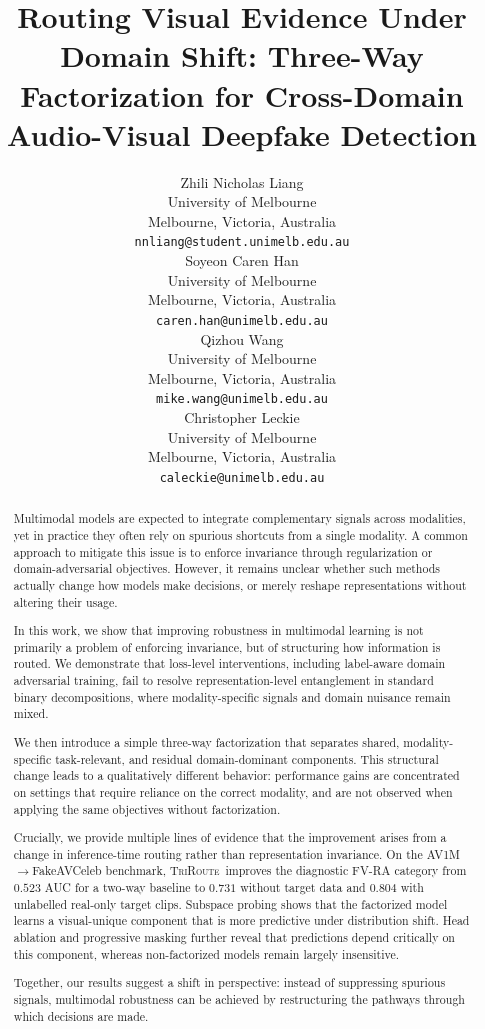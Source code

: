 \documentclass{article}
\title{Routing Visual Evidence Under Domain Shift: Three-Way Factorization for Cross-Domain Audio-Visual Deepfake Detection}
\author{%
  Zhili Nicholas Liang \\
  University of Melbourne \\
  Melbourne, Victoria, Australia \\
  \texttt{nnliang@student.unimelb.edu.au} \\
  \And
  Soyeon Caren Han \\
  University of Melbourne \\
  Melbourne, Victoria, Australia \\
  \texttt{caren.han@unimelb.edu.au} \\
  \And
  Qizhou Wang \\
  University of Melbourne \\
  Melbourne, Victoria, Australia \\
  \texttt{mike.wang@unimelb.edu.au} \\
  \And
  Christopher Leckie \\
  University of Melbourne \\
  Melbourne, Victoria, Australia \\
  \texttt{caleckie@unimelb.edu.au} \\
}
\newcommand{\method}{\textsc{TriRoute}}
\begin{document}
\maketitle

\begin{abstract}
Multimodal models are expected to integrate complementary signals across modalities, yet in practice they often rely on spurious shortcuts from a single modality. A common approach to mitigate this issue is to enforce invariance through regularization or domain-adversarial objectives. However, it remains unclear whether such methods actually change how models make decisions, or merely reshape representations without altering their usage.

In this work, we show that improving robustness in multimodal learning is not primarily a problem of enforcing invariance, but of structuring how information is routed. We demonstrate that loss-level interventions, including label-aware domain adversarial training, fail to resolve representation-level entanglement in standard binary decompositions, where modality-specific signals and domain nuisance remain mixed.

We then introduce a simple three-way factorization that separates shared, modality-specific task-relevant, and residual domain-dominant components. This structural change leads to a qualitatively different behavior: performance gains are concentrated on settings that require reliance on the correct modality, and are not observed when applying the same objectives without factorization.

Crucially, we provide multiple lines of evidence that the improvement arises from a change in inference-time routing rather than representation invariance. On the AV1M$\rightarrow$FakeAVCeleb benchmark, \method\ improves the diagnostic FV-RA category from $0.523$ AUC for a two-way baseline to $0.731$ without target data and $0.804$ with unlabelled real-only target clips. Subspace probing shows that the factorized model learns a visual-unique component that is more predictive under distribution shift. Head ablation and progressive masking further reveal that predictions depend critically on this component, whereas non-factorized models remain largely insensitive.

Together, our results suggest a shift in perspective: instead of suppressing spurious signals, multimodal robustness can be achieved by restructuring the pathways through which decisions are made.
\end{abstract}
\end{document}
